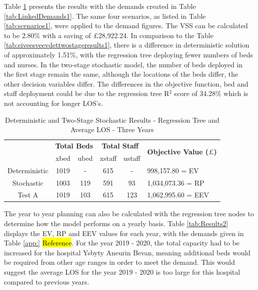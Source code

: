 \documentclass[../thesis.tex]{subfiles}
\begin{document}
Table \ref{tab:Results1} presents the results with the demands created in Table \ref{tab:LinkedDemands1}. The same four scenarios, as listed in Table \ref{tab:scenarios1}, were applied to the demand figures. The VSS can be calculated to be 2.80\% with a saving of $\pounds$28,922.24. In comparison to the Table \ref{tab:eiveesveevdettwostageresults1}, there is a difference in deterministic solution of approximately 1.51\%, with the regression tree deploying fewer numbers of beds and nurses. In the two-stage stochastic model, the number of beds deployed in the first stage remain the same, although the locations of the beds differ, the other decision variables differ. The differences in the objective function, bed and staff deployment could be due to the regression tree R$^{2}$ score of 34.28\% which is not accounting for longer LOS's. 

\begin{table}[h!]
    \centering
    \begin{tabular}{cccccl}\toprule
 & \multicolumn{2}{l}{\textbf{Total Beds}} & \multicolumn{2}{c}{\textbf{Total Staff}} & \multirow{2}{*}{\textbf{Objective Value ($\pounds$)}}\\ \cmidrule(lr){2-3} \cmidrule(lr){4-5}
 & xbed           & ubed          & xstaff         & ustaff         \\ \midrule
    Deterministic      & 1019 & - & 615 & - & 998,157.80 = EV \\ \midrule
    Stochastic &1003& 119& 591 & 93&  1,034,073.36 = RP \\ \midrule
    Test A & 1019 & 103 & 615 & 123 & 1,062,995.60 = EEV \\\bottomrule
    \end{tabular}
    \caption{Deterministic and Two-Stage Stochastic Results - Regression Tree and Average LOS - Three Years}
    \label{tab:Results1}
\end{table}

The year to year planning can also be calculated with the regression tree nodes to determine how the model performs on a yearly basis. Table \ref{tab:Results2} displays the EV, RP and EEV values for each year, with the demands given in Table \ref{app:} \hl{Reference}. For the year 2019 - 2020, the total capacity had to be increased for the hospital Ysbyty Aneurin Bevan, meaning additional beds would be required from other age ranges in order to meet the demand. This would suggest the average LOS for the year 2019 - 2020 is too large for this hospital compared to previous years.
\end{document}
